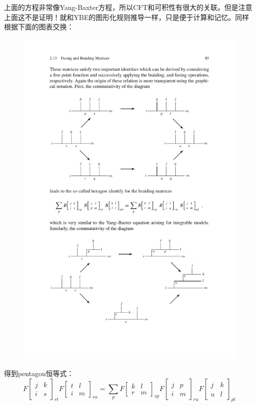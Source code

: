 上面的方程非常像Yang-Baxter方程，所以CFT和可积性有很大的关联。但是注意上面这不是证明！就和YBE的图形化规则推导一样，只是便于计算和记忆。同样根据下面的图表交换：
\begin{figure}[H]
	\centering
	\includegraphics{figs/fig14.pdf}
\end{figure}
得到pentagon恒等式：
\begin{equation}
	\boxed{
		 F\left[\begin{array}{cc}
			j & k \\
			i & s
		\end{array}\right]_{r t} F\left[\begin{array}{cc}
			t & l \\
			i & m
		\end{array}\right]_{s u} =\sum_{p} F\left[\begin{array}{cc}
			k & l \\
			r & m
		\end{array}\right]_{s p} F\left[\begin{array}{cc}
			j & p \\
			i & m
		\end{array}\right]_{r u} F\left[\begin{array}{cc}
			j & k \\
			u & l
		\end{array}\right]_{p t}
	}
\end{equation}
